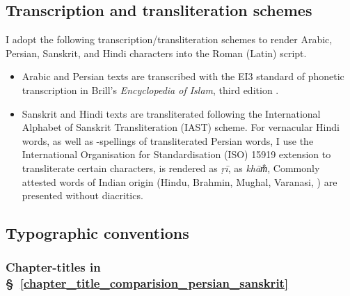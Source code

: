 \subsection{Transcription and transliteration schemes}\label{transcription_transliteration_schemes}
I adopt the following transcription/transliteration schemes to render Arabic, Persian, Sanskrit, and Hindi characters into the Roman (Latin) script.     
\begin{itemize}[topsep=0pt]
    \item Arabic and Persian texts are transcribed with the EI3 standard of phonetic transcription in Brill's \textit{Encyclopedia of Islam}, third edition \parencite[]{EIslam}.
    \item Sanskrit and Hindi texts are transliterated following the International Alphabet of Sanskrit Transliteration (IAST) scheme. For vernacular Hindi words, as well as \Devanagari-spellings of transliterated Persian words, I use the International Organisation for Standardisation (ISO) 15919 extension to transliterate certain characters,  is rendered as \textit{ṛī},  as \textit{khām̐}, \etc Commonly attested words of Indian origin (\eg Hindu, Brahmin, Mughal, Varanasi, \etcp) are presented without diacritics.
\end{itemize}

\subsection{Typographic conventions} \label{typographic_conventions} 
\subsubsection{Chapter-titles in \S~\ref{chapter_title_comparision_persian_sanskrit}}\label{chapter_titles_in_zij_sindhu}

